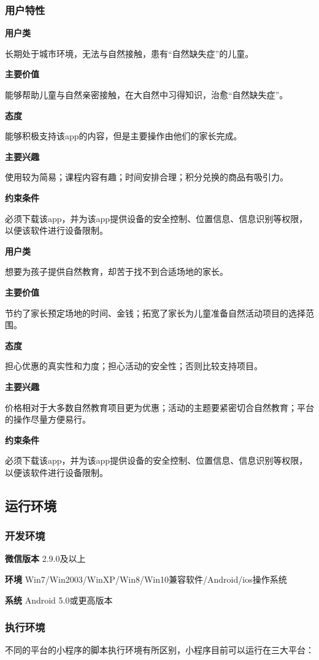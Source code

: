 \subsubsection{用户特性}
\textbf{用户类}

长期处于城市环境，无法与自然接触，患有“自然缺失症”的儿童。

\textbf{主要价值}

能够帮助儿童与自然亲密接触，在大自然中习得知识，治愈“自然缺失症”。

\textbf{态度}

能够积极支持该app的内容，但是主要操作由他们的家长完成。

\textbf{主要兴趣}

使用较为简易；课程内容有趣；时间安排合理；积分兑换的商品有吸引力。

\textbf{约束条件}

必须下载该app，并为该app提供设备的安全控制、位置信息、信息识别等权限，以便该软件进行设备限制。

\textbf{用户类}

想要为孩子提供自然教育，却苦于找不到合适场地的家长。

\textbf{主要价值}

节约了家长预定场地的时间、金钱；拓宽了家长为儿童准备自然活动项目的选择范围。

\textbf{态度}

担心优惠的真实性和力度；担心活动的安全性；否则比较支持项目。

\textbf{主要兴趣}

价格相对于大多数自然教育项目更为优惠；活动的主题要紧密切合自然教育；平台的操作尽量方便易行。

\textbf{约束条件}

必须下载该app，并为该app提供设备的安全控制、位置信息、信息识别等权限，以便该软件进行设备限制。

\subsection{运行环境}
\subsubsection{开发环境}
\textbf{微信版本} 2.9.0及以上

\textbf{环境} Win7/Win2003/WinXP/Win8/Win10兼容软件/Android/ios操作系统

\textbf{系统} Android 5.0或更高版本


\subsubsection{执行环境}
不同的平台的小程序的脚本执行环境有所区别，小程序目前可以运行在三大平台：

